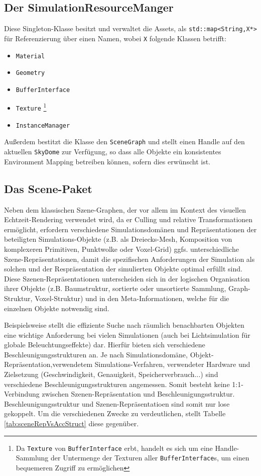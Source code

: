 \subsection{Der SimulationResourceManger}
	Diese Singleton-Klasse besitzt und verwaltet die Assets,\linebreak 
	als \lstinline|std::map<String,X*>| für Referenzierung über einen Namen, 
	wobei \lstinline|X| folgende Klassen betrifft: 
	\begin{itemize}
		\item \lstinline|Material|
		\item \lstinline|Geometry|
		\item \lstinline|BufferInterface|
		\item \lstinline|Texture| \footnote{Da \lstinline|Texture| von \lstinline|BufferInterface| erbt, 
		handelt es sich um eine Handle-Sammlung der Untermenge der Texturen aller \lstinline|BufferInterface|s,
		um einen bequemeren Zugriff zu ermöglichen}
		\item \lstinline|InstanceManager|
	\end{itemize}
	Außerdem bestitzt die Klasse den \lstinline|SceneGraph| und stellt einen Handle auf den aktuellen 
	\lstinline|SkyDome| zur Verfügung, so dass alle Objekte ein konsistentes Environment Mapping 
	betreiben können, sofern dies erwünscht ist.

		
\subsection{Das Scene-Paket}		
	Neben dem klassischen Szene-Graphen, der vor allem im Kontext des visuellen Echtzeit-Rendering verwendet wird,
	da er Culling und relative Transformationen ermöglicht, 
	erfordern verschiedene Simulationsdomänen und Repräsentationen der beteiligten Simulations-Objekte
	(z.B. als Dreiecks-Mesh, Komposition von komplexeren Primitiven, Punktwolke oder Voxel-Grid)  ggfs. 
	unterschiedliche Szene-Repräsentationen, damit die spezifischen Anforderungen der Simulation als solchen und der
	Respräsentation der simulierten Objekte optimal erfüllt sind.\\
	Diese Szenen-Repräsentationen unterscheiden sich in der logischen Organisation ihrer Objekte 
	(z.B. Baumstruktur, sortierte oder unsortierte Sammlung, Graph-Struktur, Voxel-Struktur) 
	und in den Meta-Informationen, welche für die einzelnen	Objekte notwendig sind.
	
	Beispielsweise stellt die effiziente Suche nach räumlich benachbarten Objekten eine wichtige Anforderung
	bei vielen Simulationen (auch bei Lichtsimulation für globale Beleuchtungseffekte) dar.
	Hierfür bieten sich verschiedene Beschleunigungsstrukturen an. Je nach Simulationsdomäne, 
	Objekt-Repräsentation,verwendetem Simulations-Verfahren, verwendeter Hardware und Zielsetzung 
	(Geschwindigkeit, Genauigkeit, Speicherverbrauch...) sind verschiedene Beschleunigungsstrukturen angemessen.
	Somit besteht keine 1:1-Verbindung zwischen Szenen-Repräsentation und Beschleunigungsstruktur.\\
	Beschleunigungsstruktur und Szenen-Repräsentatioen sind somit nur lose gekoppelt.
	Um die verschiedenen Zwecke zu verdeutlichen, stellt Tabelle \ref{tab:sceneRepVsAccStruct} diese gegenüber.


